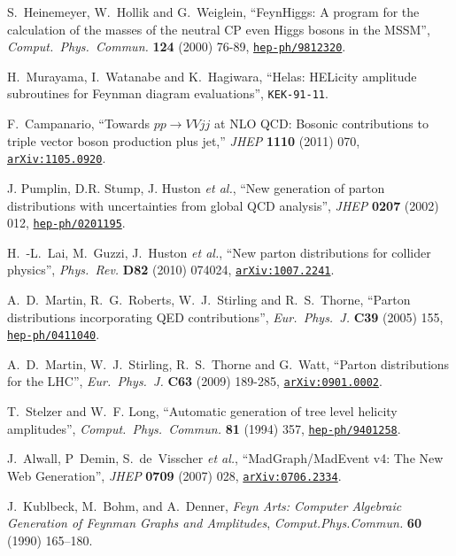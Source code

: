 \documentclass[english,12pt]{article}
\begin{document}
\begin{thebibliography}{10}
  S.~Heinemeyer, W.~Hollik and G.~Weiglein,
  ``FeynHiggs: A program for the calculation of the masses of the neutral CP even Higgs bosons in the MSSM'',
  {\em Comput.\ Phys.\ Commun.}  {\bf 124} (2000)  76-89,
\href{http://www.arXiv.org/abs/hep-ph/9812320}{{\tt hep-ph/9812320}}.

H.~Murayama, I.~Watanabe and K.~Hagiwara, ``Helas: HELicity amplitude
  subroutines for Feynman diagram evaluations'', {\tt KEK-91-11}.

  F.~Campanario,
  ``Towards $pp \rightarrow VVjj$ at NLO QCD: Bosonic contributions to triple vector boson production plus jet,''
  {\em JHEP} {\bf 1110} (2011) 070,
  \href{http://www.arXiv.org/abs/1105.0920}{{\tt arXiv:1105.0920}}.

J. Pumplin, D.R. Stump, J. Huston {\em et al.}, ``New generation of parton distributions with
  uncertainties from global QCD analysis'', {\em JHEP} {\bf 0207} (2002) 012,
\href{http://www.arXiv.org/abs/hep-ph/0201195}{{\tt hep-ph/0201195}}.

  H.~-L.~Lai, M.~Guzzi, J.~Huston {\it et al.},
  ``New parton distributions for collider physics'',
  {\em Phys.\ Rev.}  {\bf D82} (2010)  074024,
\href{http://www.arXiv.org/abs/1007.2241}{{\tt arXiv:1007.2241}}.

  A.~D.~Martin, R.~G.~Roberts, W.~J.~Stirling and R.~S.~Thorne,
  ``Parton distributions incorporating QED contributions'',
  {\em Eur.\ Phys.\ J.} {\bf C39} (2005) 155,
\href{http://www.arXiv.org/abs/hep-ph/0411040}{{\tt hep-ph/0411040}}.

  A.~D.~Martin, W.~J.~Stirling, R.~S.~Thorne and G.~Watt,
  ``Parton distributions for the LHC'',
  {\em Eur.\ Phys.\ J.} {\bf C63} (2009)  189-285,
  \href{http://arxiv.org/abs/0901.0002}{{\tt arXiv:0901.0002}}.

T.~Stelzer and W.~F. Long, ``{Automatic generation of tree level helicity
  amplitudes}'', {\em Comput.\ Phys.\ Commun.} {\bf 81} (1994) 357,
\href{http://www.arXiv.org/abs/hep-ph/9401258}{{\tt hep-ph/9401258}}.

J.~Alwall, P~Demin, S.~de~Visscher {\em et al.}, ``{MadGraph/MadEvent v4: The New Web Generation}'',
  {\em JHEP} {\bf 0709} (2007) 028,
\href{http://www.arXiv.org/abs/0706.2334}{{\tt arXiv:0706.2334}}.

J.~Kublbeck, M.~Bohm, and A.~Denner, {\it {Feyn Arts: Computer Algebraic Generation
  of Feynman Graphs and Amplitudes}},  {\em Comput.Phys.Commun.}
  {\bf 60} (1990) 165--180.


\end{thebibliography}
\end{document}
